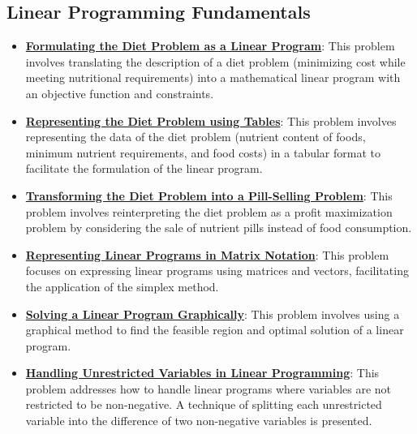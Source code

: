 \documentclass{article}%
\begin{document}
\subsection{Linear Programming Fundamentals}%
\label{subsec:LinearProgrammingFundamentals}%
\begin{itemize}[leftmargin=*]%
\item \href{https://www.math.purdue.edu/~yipn/421//2024-09-19-DualityExamples.pdf#page=5}{\textbf{Formulating the Diet Problem as a Linear Program}}: This problem involves translating the description of a diet problem (minimizing cost while meeting nutritional requirements) into a mathematical linear program with an objective function and constraints.%
\item \href{https://www.math.purdue.edu/~yipn/421//2024-09-19-DualityExamples.pdf#page=3}{\textbf{Representing the Diet Problem using Tables}}: This problem involves representing the data of the diet problem (nutrient content of foods, minimum nutrient requirements, and food costs) in a tabular format to facilitate the formulation of the linear program.%
\item \href{https://www.math.purdue.edu/~yipn/421//2024-09-19-DualityExamples.pdf#page=7}{\textbf{Transforming the Diet Problem into a Pill-Selling Problem}}: This problem involves reinterpreting the diet problem as a profit maximization problem by considering the sale of nutrient pills instead of food consumption.%
\item \href{https://www.math.purdue.edu/~yipn/421//2024-09-24-SimplexMatrix.pdf#page=1}{\textbf{Representing Linear Programs in Matrix Notation}}: This problem focuses on expressing linear programs using matrices and vectors, facilitating the application of the simplex method.%
\item \href{https://www.math.purdue.edu/~yipn/421//2024-09-24-SimplexMatrix.pdf#page=21}{\textbf{Solving a Linear Program Graphically}}: This problem involves using a graphical method to find the feasible region and optimal solution of a linear program.%
\item \href{https://www.math.purdue.edu/~yipn/421//2024-10-01-DualGeneralLP.pdf#page=2}{\textbf{Handling Unrestricted Variables in Linear Programming}}: This problem addresses how to handle linear programs where variables are not restricted to be non-negative.  A technique of splitting each unrestricted variable into the difference of two non-negative variables is presented.%
\end{itemize}
\end{document}
